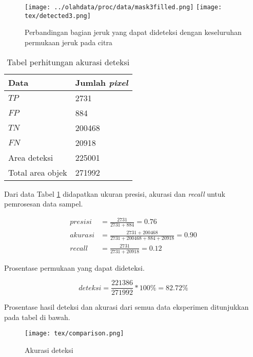 \documentclass[laporan.tex]{subfiles}
\begin{document}
\begin{figure}[h!]
\centering
\texttt{[image: ../olahdata/proc/data/mask3filled.png]} \qquad
\texttt{[image: tex/detected3.png]}
\caption{Perbandingan bagian jeruk yang dapat dideteksi dengan keseluruhan permukaan jeruk pada citra}
\end{figure}

\begin{table}[h!]
\centering
\begin{tabular}{|l|l|}
\hline
Data & Jumlah \emph{pixel} \\
\hline
$TP$ & 2731 \\
$FP$ & 884 \\
$TN$ & 200468 \\
$FN$ & 20918 \\
Area deteksi & 225001 \\
Total area objek & 271992 \\
\hline
\end{tabular}
\caption{Tabel perhitungan akurasi deteksi}
\label{table:confuse3}
\end{table}

Dari data Tabel \ref{table:confuse3} didapatkan ukuran presisi, akurasi dan \emph{recall} untuk pemrosesan data sampel.

\begin{align*}
presisi & = \frac{2731}{2731 + 884}  = 0.76 \\
akurasi & = \frac{2731+200468}{2731+200468+884+20918}  = 0.90 \\
recall & = \frac{2731}{2731+20918}  = 0.12
\end{align*}

Prosentase permukaan yang dapat dideteksi.

\begin{equation*}
deteksi =\frac{221386}{271992} \ast 100\% = 82.72\%
\end{equation*}

Prosentase hasil deteksi dan akurasi dari semua data eksperimen ditunjukkan pada tabel di bawah.

\begin{figure}[h!]
\centering
\texttt{[image: tex/comparison.png]}
\caption{Akurasi deteksi}
\end{figure}
\end{document}

